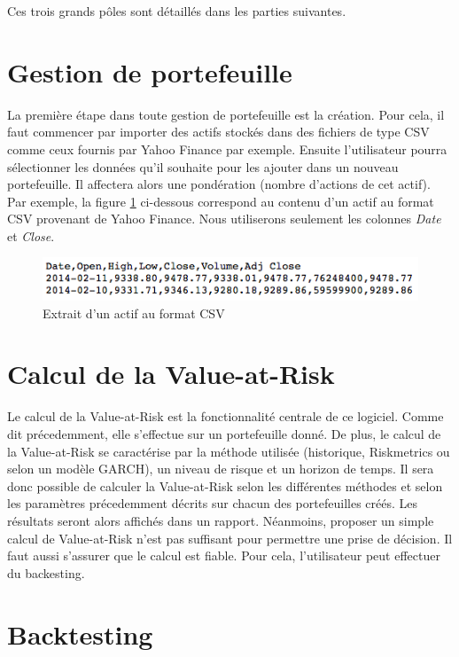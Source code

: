 \documentclass[a4paper,titlepage,french]{report}
\begin{document}
Ces trois grands pôles sont détaillés dans les parties suivantes.


\section{Gestion de portefeuille}

La première étape dans toute gestion de portefeuille est la création.
Pour cela, il faut commencer par importer des actifs stockés dans des fichiers de type CSV comme ceux fournis par Yahoo Finance par exemple.
Ensuite l'utilisateur pourra sélectionner les données qu'il souhaite pour les ajouter dans un nouveau portefeuille. Il affectera alors une pondération (nombre d'actions de cet actif). Par exemple, la figure \ref{fig:csvexample} ci-dessous correspond au contenu d'un actif au format CSV provenant de Yahoo Finance. Nous utiliserons seulement les colonnes \textit{Date} et \textit{Close}.

\begin{figure}[h]
  \center
    \includegraphics[scale=0.5]{yahoo-dax-csv-example.png}
    \caption{Extrait d'un actif au format CSV}
  \label{fig:csvexample}
\end{figure}

\section{Calcul de la Value-at-Risk}

Le calcul de la Value-at-Risk est la fonctionnalité centrale de ce logiciel. Comme dit précedemment, elle s'effectue sur un portefeuille donné.
De plus, le calcul de la Value-at-Risk se caractérise par la méthode utilisée (historique, Riskmetrics ou selon un modèle GARCH), un niveau de risque et un horizon de temps.
Il sera donc possible de calculer la Value-at-Risk selon les différentes méthodes et selon les paramètres précedemment décrits sur chacun des portefeuilles créés.
Les résultats seront alors affichés dans un rapport. Néanmoins, proposer un simple calcul de Value-at-Risk n'est pas suffisant pour permettre une prise de décision.
Il faut aussi s'assurer que le calcul est fiable.
Pour cela, l'utilisateur peut effectuer du backesting.


\section{Backtesting}
\end{document}
